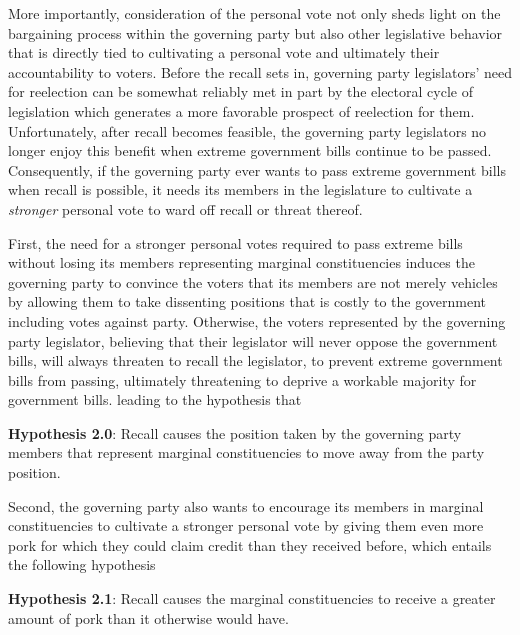 \documentclass{article}
\begin{document}
		More importantly,
		consideration of the personal vote
		not only sheds light on the bargaining process within the governing party
		but also other legislative behavior
		that is directly tied to 
		cultivating a personal vote
		and ultimately their accountability to voters.
		Before the recall sets in,
		governing party legislators' need for reelection
		can be somewhat reliably met in part by the
		electoral cycle of legislation
		which generates a more favorable prospect of reelection for them.
		Unfortunately,
		after recall becomes feasible,
		the governing party legislators no longer enjoy this
		benefit when extreme government bills continue to be passed.
		Consequently,
		if the governing party ever wants to pass extreme government bills
		when recall is possible,
		it needs its members in the legislature to
		cultivate a \textit{stronger} personal vote
		to ward off recall or threat thereof.
		
		First, the need for a stronger personal votes
		required to pass extreme bills
		without losing its members representing marginal constituencies
		induces the governing party
		to convince the voters that its members 
		are not merely vehicles
		by allowing them to take dissenting positions
		that is costly to the government
		including votes against party.
		Otherwise,
		the voters represented by the governing party legislator,
		believing that their legislator will never oppose the government bills,
		will always threaten to recall the legislator,
		to prevent extreme government bills from passing,
		ultimately threatening to deprive a workable majority for government bills.
		leading to the hypothesis that
		
		\textbf{Hypothesis 2.0}:
		Recall causes
		the position taken by the governing party members
		that represent marginal constituencies to move away from the party position. 
		
		
		Second,
		the governing party also wants to encourage
		its members in marginal constituencies to cultivate a stronger personal vote
		by giving them even more pork for which they could claim credit than they received before,
		which entails the following hypothesis
		
		\textbf{Hypothesis 2.1}:
		Recall causes
		the marginal constituencies to receive a greater amount of pork
		than it otherwise would have.
		
		
\end{document}
